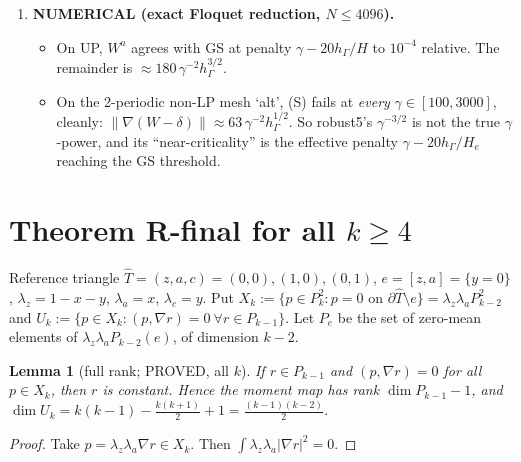 \documentclass[11pt]{article}
\newtheorem{lemma}[theorem]{Lemma}
\theoremstyle{remark}
\newcommand{\hG}{h_\Gamma}
\begin{document}
\begin{enumerate}
 \begin{itemize}
 \item Order $k+1$ for $K$-degenerate data with non-constant edge constant is PROVED on equal-height families, and on LP$^{++}$ for $\gamma\ge\gamma(\phi)$.
 \item Order $k+\frac32$ is PROVED for $\phi=(r-1)^k$ on \textsf{UP} ($k=4,\dots,7$). The key coefficient is exact: $c_1=\rho^3/900$ and $c_2=\rho^3/525$ for $k=4$.
 \end{itemize}
\item \textbf{NUMERICAL (exact Floquet reduction, $N\le4096$).}
 \begin{itemize}
 \item On \textsf{UP}, $W^a$ agrees with GS at penalty $\gamma-20\hG/H$ to $10^{-4}$ relative. The remainder is $\approx180\,\gamma^{-2}\hG^{3/2}$.
 \item On the 2-periodic non-LP mesh `alt', (S) fails at \emph{every} $\gamma\in[100,3000]$, cleanly: $\|\nabla(W-\delta)\|\approx63\,\gamma^{-2}\hG^{1/2}$.
 So robust5's $\gamma^{-3/2}$ is not the true $\gamma$-power, and its ``near-criticality'' is the effective penalty $\gamma-20\hG/H_e$ reaching the GS threshold.
 \end{itemize}
\end{enumerate}

\section{Theorem R-final for all $k\ge4$}
Reference triangle $\hat T=(z,a,c)=(0,0),(1,0),(0,1)$, $e=[z,a]=\{y=0\}$, $\lambda_z=1-x-y$, $\lambda_a=x$, $\lambda_c=y$.
Put $X_k:=\{p\in P_k^2:p=0$ on $\partial\hat T\setminus e\}=\lambda_z\lambda_aP_{k-2}^2$ and $U_k:=\{p\in X_k:(p,\nabla r)=0\ \forall r\in P_{k-1}\}$.
Let $P_e$ be the set of zero-mean elements of $\lambda_z\lambda_aP_{k-2}(e)$, of dimension $k-2$.

\begin{lemma}[full rank; PROVED, all $k$]\label{lem:rank}
If $r\in P_{k-1}$ and $(p,\nabla r)=0$ for all $p\in X_k$, then $r$ is constant. Hence the moment map has rank $\dim P_{k-1}-1$, and
$\dim U_k=k(k-1)-\frac{k(k+1)}2+1=\frac{(k-1)(k-2)}2$.
\end{lemma}
\begin{proof}Take $p=\lambda_z\lambda_a\nabla r\in X_k$. Then $\int\lambda_z\lambda_a|\nabla r|^2=0$.\end{proof}
\end{document}
